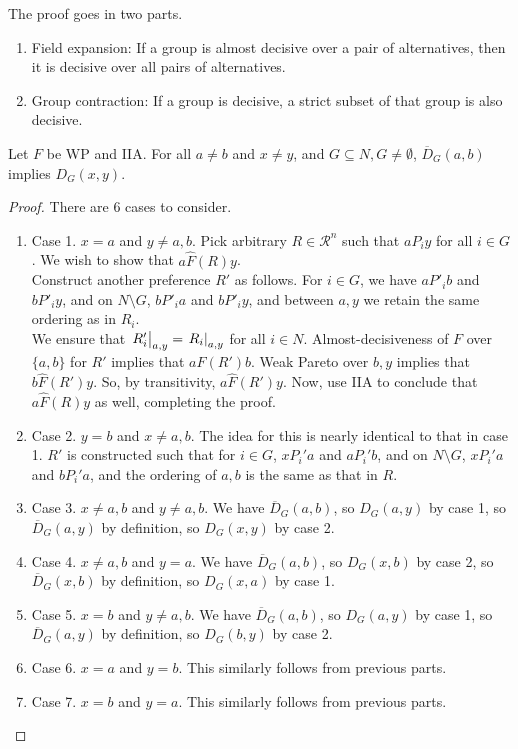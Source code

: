 	The proof goes in two parts.
	\begin{enumerate}
		\item Field expansion: If a group is almost decisive over a pair of alternatives, then it is decisive over all pairs of alternatives.
		\item Group contraction: If a group is decisive, a strict subset of that group is also decisive.
	\end{enumerate}

	\begin{lemma}
		\label{lem: arrow field expansion}
		Let $F$ be WP and IIA. For all $a \ne b$ and $x \ne y$, and $G \subseteq N, G \ne \emptyset$,
		$\overline{D}_G(a,b)$ implies $D_G(x,y)$.
	\end{lemma}
	\begin{proof}
		There are $6$ cases to consider.
		\begin{enumerate}
			\item Case 1. $x = a$ and $y \ne a,b$. Pick arbitrary $R \in \mathcal{R}^n$ such that $a P_i y$ for all $i \in G$. We wish to show that $a \hat{F}(R) y$.\\
			Construct another preference $R'$ as follows. For $i \in G$, we have $a P'_i b$ and $b P'_i y$, and on $N \setminus G$, $b P'_i a$ and $b P'_i y$, and between $a,y$ we retain the same ordering as in $R_i$.\\
			We ensure that $\left.R_i'\right|_{a,y} = \left.R_i\right|_{a,y}$ for all $i \in N$. Almost-decisiveness of $F$ over $\{a,b\}$ for $R'$ implies that $a \hat{F}(R') b$. Weak Pareto over $b,y$ implies that $b \hat{F}(R') y$. So, by transitivity, $a \hat{F}(R') y$. Now, use IIA to conclude that $a \hat{F}(R) y$ as well, completing the proof.
			\item Case 2. $y = b$ and $x \ne a,b$. The idea for this is nearly identical to that in case 1. $R'$ is constructed such that for $i \in G$, $x P_i' a$ and $a P_i' b$, and on $N \setminus G$, $x P_i' a$ and $b P_i' a$, and the ordering of $a,b$ is the same as that in $R$.
			\item Case 3. $x \ne a,b$ and $y \ne a,b$. We have $\overline{D}_G(a,b)$, so $D_G(a,y)$ by case 1, so $\overline{D}_G(a,y)$ by definition, so $D_G(x,y)$ by case 2.
			\item Case 4. $x \ne a,b$ and $y = a$. We have $\overline{D}_G(a,b)$, so $D_G(x,b)$ by case 2, so $\overline{D}_G(x,b)$ by definition, so $D_G(x,a)$ by case 1.
			\item Case 5. $x = b$ and $y \ne a,b$. We have $\overline{D}_G(a,b)$, so $D_G(a,y)$ by case 1, so $\overline{D}_G(a,y)$ by definition, so $D_G(b,y)$ by case 2.
			\item Case 6. $x = a$ and $y = b$. This similarly follows from previous parts.
			\item Case 7. $x = b$ and $y = a$. This similarly follows from previous parts.
		\end{enumerate}
	\end{proof}


